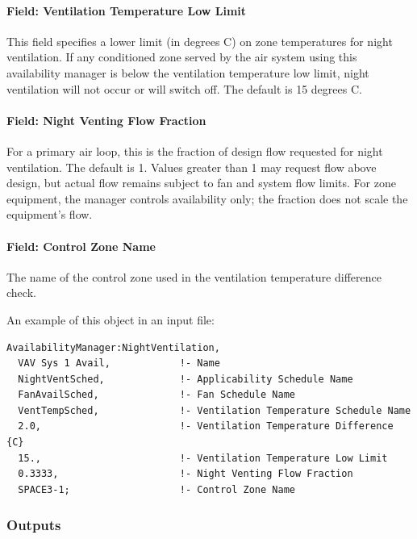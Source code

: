 \paragraph{Field: Ventilation Temperature Low Limit}\label{field-ventilation-temperature-low-limit}

This field specifies a lower limit (in degrees C) on zone temperatures for night ventilation. If any conditioned zone served by the air system using this availability manager is below the ventilation temperature low limit, night ventilation will not occur or will switch off. The default is 15 degrees C.

\paragraph{Field: Night Venting Flow Fraction}\label{field-night-venting-flow-fraction}

For a primary air loop, this is the fraction of design flow requested for night ventilation. The default is 1. Values greater than 1 may request flow above design, but actual flow remains subject to fan and system flow limits. For zone equipment, the manager controls availability only; the fraction does not scale the equipment's flow.

\paragraph{Field: Control Zone Name}\label{field-control-zone-name-000}

The name of the control zone used in the ventilation temperature difference check.

An example of this object in an input file:

\begin{lstlisting}
AvailabilityManager:NightVentilation,
  VAV Sys 1 Avail,            !- Name
  NightVentSched,             !- Applicability Schedule Name
  FanAvailSched,              !- Fan Schedule Name
  VentTempSched,              !- Ventilation Temperature Schedule Name
  2.0,                        !- Ventilation Temperature Difference   {C}
  15.,                        !- Ventilation Temperature Low Limit
  0.3333,                     !- Night Venting Flow Fraction
  SPACE3-1;                   !- Control Zone Name
\end{lstlisting}

\subsubsection{Outputs}\label{outputs-8-008}

